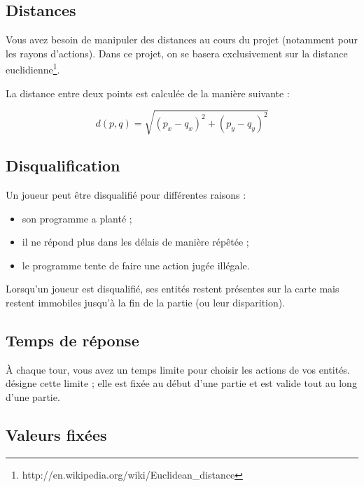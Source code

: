 
\subsection{Distances} %

Vous avez besoin de manipuler des distances au cours du projet (notamment pour les rayons d'actions).
Dans ce projet, on se basera exclusivement sur la distance euclidienne\footnote{http://en.wikipedia.org/wiki/Euclidean\_distance}.

La distance entre deux points est calculée de la manière suivante :
\begin{center}
    $$ d(p,q) = \sqrt{(p_x - q_x)^2 + (p_y - q_y)^2} $$
    
\end{center}


\subsection{Disqualification} %

Un joueur peut être disqualifié pour différentes raisons :
\begin{itemize}
    \item son programme a planté ;
    \item il ne répond plus dans les délais de manière répêtée ;
    \item le programme tente de faire une action jugée illégale.
\end{itemize}

Lorsqu'un joueur est disqualifié, ses entités restent présentes sur la carte mais restent immobiles jusqu'à la fin de la partie (ou leur disparition).


\subsection{Temps de réponse} %

À chaque tour, vous avez un temps limite pour choisir les actions de vos entités.
\timinglimit{} désigne cette limite ; elle est fixée au début d'une partie et est valide tout au long d'une partie.


\subsection{Valeurs fixées} %

